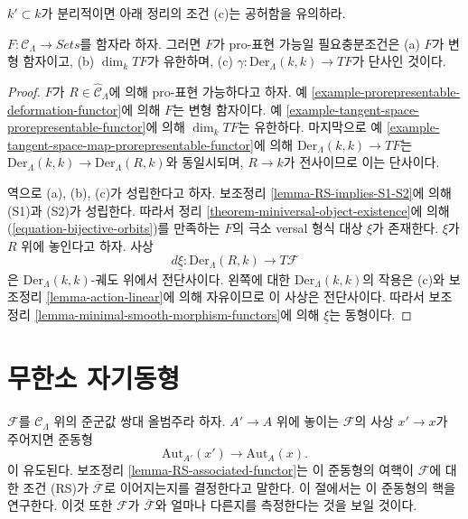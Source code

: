 \noindent
$k' \subset k$가 분리적이면 아래 정리의 조건 (c)는 공허함을 유의하라.

\begin{theorem}
\label{theorem-Schlessinger-prorepresentability}
$F: \mathcal{C}_\Lambda \to \textit{Sets}$를 함자라 하자.
그러면 $F$가 pro-표현 가능일 필요충분조건은
(a) $F$가 변형 함자이고,
(b) $\dim_k TF$가 유한하며, (c)
$\gamma : \text{Der}_\Lambda(k, k) \to TF$가 단사인 것이다.
\end{theorem}

\begin{proof}
$F$가 $R \in \widehat{\mathcal{C}}_\Lambda$에 의해
pro-표현 가능하다고 하자. 예
\ref{example-prorepresentable-deformation-functor}에 의해
$F$는 변형 함자이다. 예
\ref{example-tangent-space-prorepresentable-functor}에 의해
$\dim_k TF$는 유한하다. 마지막으로 예
\ref{example-tangent-space-map-prorepresentable-functor}에 의해
$\text{Der}_\Lambda(k, k) \to TF$는
$\text{Der}_\Lambda(k, k) \to \text{Der}_\Lambda(R, k)$와 동일시되며,
$R \to k$가 전사이므로 이는 단사이다.

\medskip\noindent
역으로 (a), (b), (c)가 성립한다고 하자. 보조정리
\ref{lemma-RS-implies-S1-S2}에 의해 (S1)과 (S2)가 성립한다.
따라서 정리 \ref{theorem-miniversal-object-existence}에 의해
(\ref{equation-bijective-orbits})를 만족하는 $F$의 극소 versal 형식 대상
$\xi$가 존재한다. $\xi$가 $R$ 위에 놓인다고 하자. 사상
$$
d\underline{\xi} : \text{Der}_\Lambda(R, k) \to T\mathcal{F}
$$
은 $\text{Der}_\Lambda(k, k)$-궤도 위에서 전단사이다.
왼쪽에 대한 $\text{Der}_\Lambda(k, k)$의 작용은 (c)와
보조정리 \ref{lemma-action-linear}에 의해 자유이므로 이 사상은
전단사이다. 따라서 보조정리
\ref{lemma-minimal-smooth-morphism-functors}에 의해
$\underline{\xi}$는 동형이다.
\end{proof}

\section{무한소 자기동형}
\label{section-infinitesimal-automorphisms}

\noindent
$\mathcal{F}$를 $\mathcal{C}_\Lambda$ 위의 준군값 쌍대 올범주라 하자.
$A' \to A$ 위에 놓이는 $\mathcal{F}$의 사상 $x' \to x$가 주어지면
준동형
$$
\text{Aut}_{A'}(x') \to \text{Aut}_A(x).
$$
이 유도된다. 보조정리 \ref{lemma-RS-associated-functor}는 이 준동형의
여핵이 $\mathcal{F}$에 대한 조건 (RS)가
$\overline{\mathcal{F}}$로 이어지는지를 결정한다고 말한다.
이 절에서는 이 준동형의 핵을 연구한다. 이것 또한 $\mathcal{F}$가
$\overline{\mathcal{F}}$와 얼마나 다른지를 측정한다는 것을 보일 것이다.

